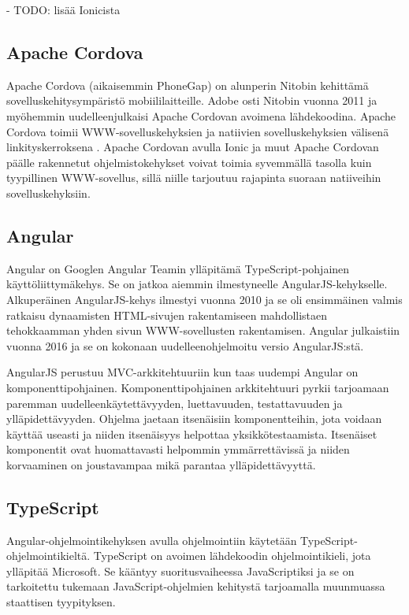 \documentclass[utf8]{gradu3}
\begin{document}
- TODO: lisää Ionicista

\subsection{Apache Cordova}

Apache Cordova (aikaisemmin PhoneGap) on alunperin Nitobin kehittämä sovelluskehitysympäristö mobiililaitteille. Adobe osti Nitobin vuonna 2011 ja myöhemmin uudelleenjulkaisi Apache Cordovan avoimena lähdekoodina. Apache Cordova toimii WWW-sovelluskehyksien ja natiivien sovelluskehyksien välisenä linkityskerroksena \parencite[]{ionic-framework-hybrid}. Apache Cordovan avulla Ionic ja muut Apache Cordovan päälle rakennetut ohjelmistokehykset voivat toimia syvemmällä tasolla kuin tyypillinen WWW-sovellus, sillä niille tarjoutuu rajapinta suoraan natiiveihin sovelluskehyksiin.


\subsection{Angular}

Angular on Googlen Angular Teamin ylläpitämä TypeScript-pohjainen käyttöliittymäkehys. Se on jatkoa aiemmin ilmestyneelle AngularJS-kehykselle. Alkuperäinen AngularJS-kehys ilmestyi vuonna 2010 ja se oli ensimmäinen valmis ratkaisu dynaamisten HTML-sivujen rakentamiseen mahdollistaen tehokkaamman yhden sivun WWW-sovellusten rakentamisen. Angular julkaistiin vuonna 2016 ja se on kokonaan uudelleenohjelmoitu versio AngularJS:stä.

AngularJS perustuu MVC-arkkitehtuuriin kun taas uudempi Angular on komponenttipohjainen. Komponenttipohjainen arkkitehtuuri pyrkii tarjoamaan paremman uudelleenkäytettävyyden, luettavuuden, testattavuuden ja ylläpidettävyyden. Ohjelma jaetaan itsenäisiin komponentteihin, jota voidaan käyttää useasti ja niiden itsenäisyys helpottaa yksikkötestaamista. Itsenäiset komponentit ovat huomattavasti helpommin ymmärrettävissä ja niiden korvaaminen on joustavampaa mikä parantaa ylläpidettävyyttä. \parencite[]{good-and-bad-angular}

\subsection{TypeScript}

Angular-ohjelmointikehyksen avulla ohjelmointiin käytetään TypeScript-ohjelmointikieltä. TypeScript on avoimen lähdekoodin ohjelmointikieli, jota ylläpitää Microsoft. Se kääntyy suoritusvaiheessa JavaScriptiksi ja se on tarkoitettu tukemaan JavaScript-ohjelmien kehitystä tarjoamalla muunmuassa staattisen tyypityksen. 
\end{document}
